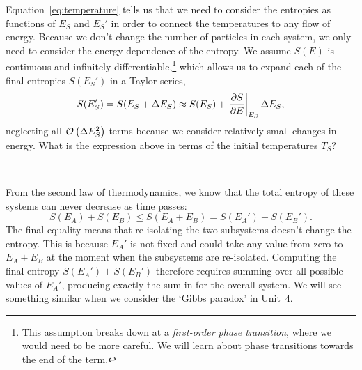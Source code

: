 Equation~\ref{eq:temperature} tells us that we need to consider the entropies as functions of $E_S$ and $E_S'$ in order to connect the temperatures to any flow of energy.
Because we don't change the number of particles in each system, we only need to consider the energy dependence of the entropy.
We assume $S(E)$ is continuous and infinitely differentiable,\footnote{This assumption breaks down at a \textit{first-order phase transition}, where we would need to be more careful.  We will learn about phase transitions towards the end of the term.} which allows us to expand each of the final entropies $S(E_S')$ in a Taylor series,
\begin{equation*}
  S(E_S') = S(E_S + \Delta E_S) \approx S(E_S) + \left.\frac{\partial S}{\partial E}\right|_{E_S} \Delta E_S,
\end{equation*}
neglecting all $\mathcal O\left(\Delta E_S^2\right)$ terms because we consider relatively small changes in energy.
What is the expression above in terms of the initial temperatures $T_S$?
\begin{mdframed}
  \ \\[50 pt]
\end{mdframed}

From the second law of thermodynamics, we know that the total entropy of these systems can never decrease as time passes:
\begin{equation}
  \label{eq:entropy_ineq}
  S(E_A) + S(E_B) \leq S(E_A + E_B) = S(E_A') + S(E_B').
\end{equation}
The final equality means that re-isolating the two subsystems doesn't change the entropy.
This is because $E_A'$ is not fixed and could take any value from zero to $E_A + E_B$ at the moment when the subsystems are re-isolated.
Computing the final entropy $S(E_A') + S(E_B')$ therefore requires summing over all possible values of $E_A'$, producing exactly the sum in  for the overall system.
We will see something similar when we consider the `Gibbs paradox' in Unit~4.


